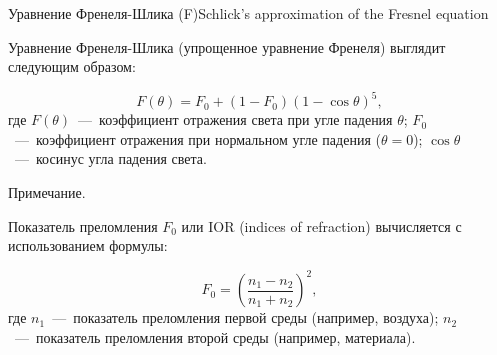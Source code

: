 \documentclass{beamer}
\begin{document}
	\begin{frame}{Уравнение Френеля-Шлика (F)}{Schlick's approximation of the Fresnel equation}
		

		Уравнение Френеля-Шлика (упрощенное уравнение Френеля) выглядит следующим образом:
		
		\[ F(\theta) = F_0 + (1 - F_0)(1 - \cos \theta)^5 ,\]
		где
		\( F(\theta) \)~---~коэффициент отражения света при угле падения \( \theta \);
		\( F_0 \)~---~коэффициент отражения при нормальном угле падения (\( \theta = 0 \));
		\( \cos \theta \)~---~косинус угла падения света.
		
		\footnotesize
		Примечание.

		Показатель преломления $F_0$ или IOR (indices of refraction) вычисляется с использованием формулы:
		
		\[ F_0 = \left(\frac{n_1 - n_2}{n_1 + n_2}\right)^2 ,\]
		где
		\( n_1 \)~---~показатель преломления первой среды (например, воздуха);
		\( n_2 \)~---~показатель преломления второй среды (например, материала).
		
		
			\end{frame}
\end{document}
